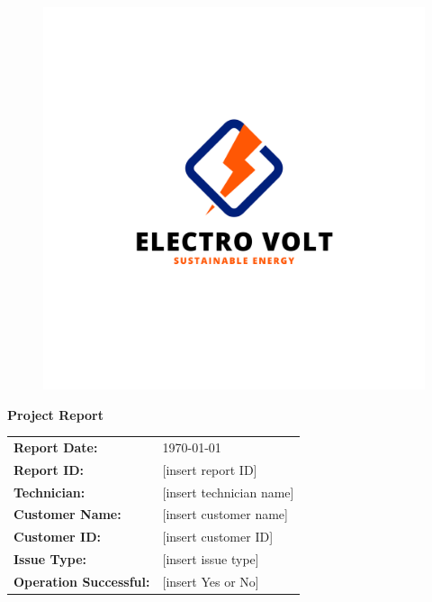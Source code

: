 \documentclass{article}
\begin{document}
\pagestyle{fancy}


\begin{figure}[htbp]
	\centering
	\includegraphics[width=\textwidth]{img/company_logo.png}
\end{figure}

\begin{center}
    \Huge \textbf{Project Report}
\end{center}

\vspace{5em}

\begin{tabularx}{\textwidth}{@{}l X@{}}
    \textbf{Report Date:} & \today \\
    \textbf{Report ID:} & [insert report ID] \\
    \textbf{Technician:} & [insert technician name] \\
    \textbf{Customer Name:} & [insert customer name] \\
    \textbf{Customer ID:} & [insert customer ID] \\
    \textbf{Issue Type:} & [insert issue type] \\
    \textbf{Operation Successful:} & [insert Yes or No] \\
\end{tabularx}
\end{document}
